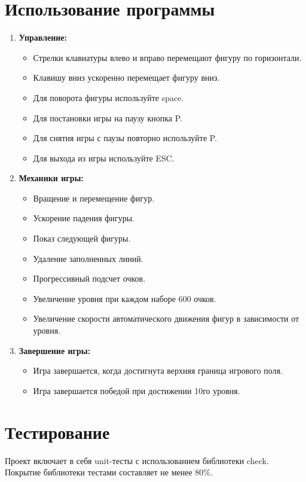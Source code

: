 \documentclass[12pt, letterpaper, twoside]{article}
\begin{document}
\section{Использование программы}

\begin{enumerate}
    \item \textbf{Управление:}
        \begin{itemize}
            \item Стрелки клавиатуры влево и вправо перемещают фигуру по горизонтали.
            \item Клавишу вниз ускоренно перемещает фигуру вниз.
            \item Для поворота фигуры используйте space.
            \item Для постановки игры на паузу кнопка P.
            \item Для снятия игры с паузы повторно используйте P.
            \item Для выхода из игры используйте ESC.
        \end{itemize}
    \item \textbf{Механики игры:}
        \begin{itemize}
            \item Вращение и перемещение фигур.
            \item Ускорение падения фигуры.
            \item Показ следующей фигуры.
            \item Удаление заполненных линий.
            \item Прогрессивный подсчет очков.
            \item Увеличение уровня при каждом наборе 600 очков.
            \item Увеличение скорости автоматического движения фигур в зависимости от уровня.
        \end{itemize}
    \item \textbf{Завершение игры:}
        \begin{itemize}
            \item Игра завершается, когда достигнута верхняя граница игрового поля.
            \item Игра завершается победой при достижении 10го уровня.
        \end{itemize}
\end{enumerate}

\section{Тестирование}

Проект включает в себя unit-тесты с использованием библиотеки check. Покрытие библиотеки тестами составляет не менее 80\%.
\end{document}

